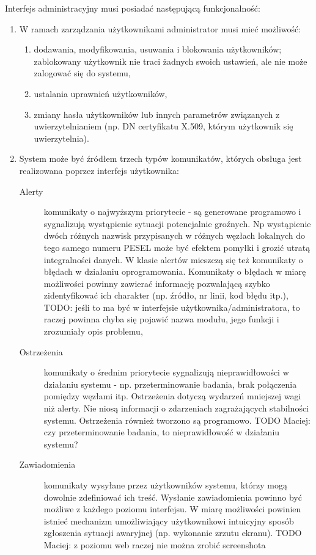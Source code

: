 \documentclass[a4paper]{report}
\begin{document}
\begin{enumerate}
Interfejs administracyjny musi posiadać następującą funkcjonalność:
\begin{enumerate}
  \item W ramach zarządzania użytkownikami administrator musi mieć możliwość:
    \begin{enumerate}
      \item dodawania, modyfikowania, usuwania i blokowania użytkowników; zablokowany użytkownik nie traci żadnych swoich ustawień, ale nie może zalogować się do systemu,
      \item ustalania uprawnień użytkowników,
      \item zmiany hasła użytkowników lub innych parametrów związanych z uwierzytelnianiem (np. DN certyfikatu X.509, którym użytkownik się uwierzytelnia).
    \end{enumerate}

  \item System może być źródłem trzech typów komunikatów, których obsługa jest realizowana poprzez interfejs użytkownika:
    \begin{description}
      \item[Alerty] komunikaty o najwyższym priorytecie - są generowane programowo i sygnalizują wystąpienie sytuacji potencjalnie groźnych. Np wystąpienie dwóch różnych nazwisk przypisanych w różnych węzłach lokalnych do tego samego numeru PESEL może być efektem pomyłki i grozić utratą integralności danych. W klasie alertów mieszczą się też komunikaty o błędach w działaniu oprogramowania. Komunikaty o błędach w miarę możliwości powinny zawierać informację pozwalającą szybko zidentyfikować ich charakter (np. źródło, nr linii, kod błędu itp.), TODO: jeśli to ma być w interfejsie użytkownika/administratora, to raczej powinna chyba się pojawić nazwa modułu, jego funkcji i zrozumiały opis problemu,

      \item[Ostrzeżenia] komunikaty o średnim priorytecie sygnalizują nieprawidłowości w działaniu systemu - np. przeterminowanie badania, brak połączenia pomiędzy węzłami itp. Ostrzeżenia dotyczą wydarzeń mniejszej wagi niż alerty. Nie niosą informacji o zdarzeniach zagrażających stabilności systemu. Ostrzeżenia również tworzono są programowo. TODO Maciej: czy przeterminowanie badania, to nieprawidłowość w działaniu systemu?

      \item[Zawiadomienia] komunikaty wysyłane przez użytkowników systemu, którzy mogą dowolnie zdefiniować ich treść. Wysłanie zawiadomienia powinno być możliwe z każdego poziomu interfejsu. W miarę możliwości powinien istnieć mechanizm umożliwiający użytkownikowi intuicyjny sposób zgłoszenia sytuacji awaryjnej (np. wykonanie zrzutu ekranu). TODO Maciej: z poziomu web raczej nie można zrobić screenshota
    \end{description}


\end{enumerate}
\end{enumerate}
\end{document}
